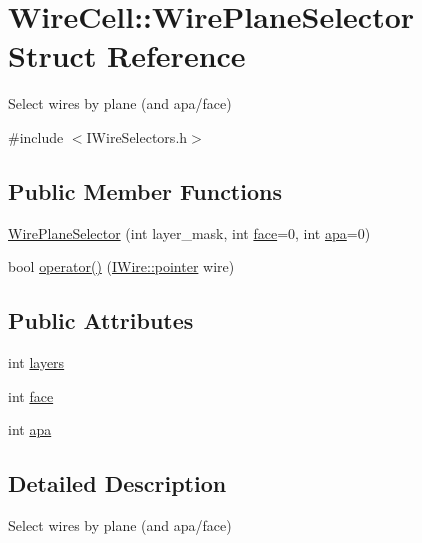 \hypertarget{struct_wire_cell_1_1_wire_plane_selector}{}\section{Wire\+Cell\+:\+:Wire\+Plane\+Selector Struct Reference}
\label{struct_wire_cell_1_1_wire_plane_selector}


Select wires by plane (and apa/face)  




{\ttfamily \#include $<$I\+Wire\+Selectors.\+h$>$}

\subsection*{Public Member Functions}
\begin{DoxyCompactItemize}
\item 
\hyperlink{struct_wire_cell_1_1_wire_plane_selector_acd40edb520122cc31b786a20bf124318}{Wire\+Plane\+Selector} (int layer\+\_\+mask, int \hyperlink{struct_wire_cell_1_1_wire_plane_selector_a9d4c4d9f12dded5d04aa20dd5f6c22d7}{face}=0, int \hyperlink{struct_wire_cell_1_1_wire_plane_selector_a66fd505d67957b122581c452c825d791}{apa}=0)
\item 
bool \hyperlink{struct_wire_cell_1_1_wire_plane_selector_a4eed0b861e35e6e53872247eefa03fd8}{operator()} (\hyperlink{class_wire_cell_1_1_i_data_aff870b3ae8333cf9265941eef62498bc}{I\+Wire\+::pointer} wire)
\end{DoxyCompactItemize}
\subsection*{Public Attributes}
\begin{DoxyCompactItemize}
\item 
int \hyperlink{struct_wire_cell_1_1_wire_plane_selector_af7a3a8d2aeff9d587c24a211be1757c5}{layers}
\item 
int \hyperlink{struct_wire_cell_1_1_wire_plane_selector_a9d4c4d9f12dded5d04aa20dd5f6c22d7}{face}
\item 
int \hyperlink{struct_wire_cell_1_1_wire_plane_selector_a66fd505d67957b122581c452c825d791}{apa}
\end{DoxyCompactItemize}


\subsection{Detailed Description}
Select wires by plane (and apa/face) 

